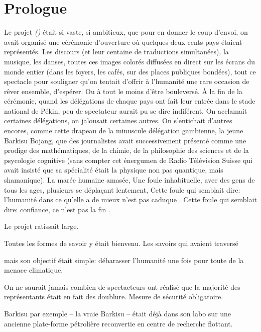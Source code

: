 \chapter*{Prologue}

Le projet \textit{\nomProjet{} (\nomProjetEn{})} était si vaste, si ambitieux,
que pour en donner le coup d'envoi, on avait organisé une cérémonie d'ouverture
où quelques deux cents pays étaient représentés.  
%
Les discours (et leur centaine de traductions simultanées), la musique, les
danses, toutes ces images colorés diffusées en direct sur les écrans du monde
entier (dans les foyers, les cafés, sur des places publiques bondées), tout ce
spectacle pour souligner qu'on tentait d'offrir à l'humanité une rare occasion
de rêver ensemble, d'espérer.
%
Ou à tout le moins d'être bouleversé.
%
À la fin de la cérémonie, quand les délégations de chaque pays ont fait leur
entrée dans le stade national de Pékin,
peu de spectateur aurait pu se dire
indiférent.
%
On acclamait certaines délégations, on jalousait certaines autres.
On s'entichait d'autres encores, comme cette
drapeau de la minuscule délégation gambienne, la jeune Barkisu Bojang, que des
journalistes avait successivement présenté comme une prodige des mathématiques,
de la chimie, de la philosophie des sciences et de la psycologie cognitive
(sans compter cet énergumen de Radio Télévision Suisse qui avait insisté que sa
spécialité était la physique non pas quantique, mais shamanique).
%
La marée humaine amasée, 
Une foule inhabituelle, avec des gens de tous les ages, plusieurs se déplaçant
lentement, 
Cette foule qui semblait dire: \og l'humanité dans ce qu'elle a de mieux n'est pas caduque \fg.
Cette foule qui semblait dire: \og confiance, ce n'est pas la fin \fg.
%

Le projet \nomProjet{} ratissait large. 

Toutes les formes de savoir y était bienvenu.
Les savoirs qui avaient traversé

mais son objectif était simple:
débarasser l'humanité une fois pour toute de la menace climatique. 



On ne saurait jamais combien de spectacteurs ont réalisé que la majorité des représentants 
était en fait des doublure. Mesure de sécurité obligatoire.

Barkisu par exemple -- la vraie Barkisu -- était déjà dans son labo sur une
ancienne plate-forme pétrolière reconvertie en centre de recherche flottant.




